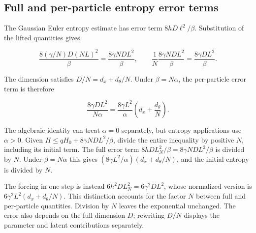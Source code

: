 \documentclass[11pt,a4paper]{report}
\begin{document}
\subsection{\texorpdfstring{Full and per-particle entropy error terms}{Full and per-particle entropy error terms}}
\label{report-step-IPLA-LSI-Scaling-lean-3}


The Gaussian Euler entropy estimate has error term \(8hD\ell^2/\beta\). Substitution of the lifted quantities gives

\[\frac{8(\gamma/N)D(NL)^2}{\beta}=\frac{8\gamma ND L^2}{\beta},\qquad \frac1N\frac{8\gamma ND L^2}{\beta}=\frac{8\gamma DL^2}{\beta}.\]

The dimension satisfies \(D/N=d_x+d_\theta/N\). Under \(\beta=N\alpha\), the per-particle error term is therefore

\[\frac{8\gamma DL^2}{N\alpha}=\frac{8\gamma L^2}{\alpha}\left(d_x+\frac{d_\theta}{N}\right).\]

The algebraic identity can treat \(\alpha=0\) separately, but entropy applications use \(\alpha>0\). Given \(H\le qH_0+8\gamma ND L^2/\beta\), divide the entire inequality by positive \(N\), including its initial term. The full error term \(8hDL_N^2/\beta=8\gamma NDL^2/\beta\) is divided by \(N\). Under \(\beta=N\alpha\) this gives \((8\gamma L^2/\alpha)(d_x+d_\theta/N)\), and the initial entropy is divided by \(N\).



The forcing in one step is instead \(6h^2DL_N^2=6\gamma^2DL^2\), whose normalized version is \(6\gamma^2L^2(d_x+d_\theta/N)\). This distinction accounts for the factor \(N\) between full and per-particle quantities. Division by \(N\) leaves the exponential unchanged. The error also depends on the full dimension \(D\); rewriting \(D/N\) displays the parameter and latent contributions separately.
\end{document}
